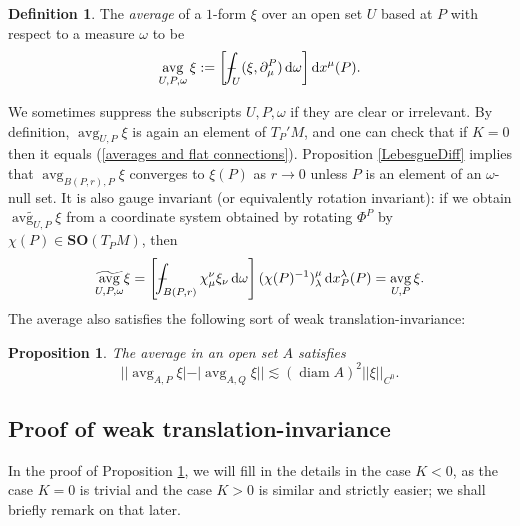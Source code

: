 \documentclass[reqno,11pt]{amsart}
\newcommand{\SpOrth}{\mathbf{SO}}
\DeclareMathOperator{\avg}{avg}
\DeclareMathOperator{\diam}{diam}
\newcommand*\dif{\mathop{}\!\mathrm{d}}
\newcommand{\dfn}[1]{\emph{#1}\index{#1}}
\newtheorem{proposition}[theorem]{Proposition}
\theoremstyle{definition}
\newtheorem{definition}[theorem]{Definition}
\numberwithin{equation}{section}
\def\Xint#1{\mathchoice
{\XXint\displaystyle\textstyle{#1}}%
{\XXint\textstyle\scriptstyle{#1}}%
{\XXint\scriptstyle\scriptscriptstyle{#1}}%
{\XXint\scriptscriptstyle\scriptscriptstyle{#1}}%
\!\int}
\def\XXint#1#2#3{{\setbox0=\hbox{$#1{#2#3}{\int}$ }
\vcenter{\hbox{$#2#3$ }}\kern-.6\wd0}}
\def\dashint{\Xint-}
\begin{document}
\begin{definition}
The \dfn{average} of a $1$-form $\xi$ over an open set $U$ based at $P$ with respect to a measure $\omega$ to be
$$\avg_{U, P, \omega} \xi := \left[\dashint_U (\xi, \partial^P_\mu) \dif \omega\right] \dif x^\mu(P).$$
\end{definition}

We sometimes suppress the subscripts $U, P, \omega$ if they are clear or irrelevant.
By definition, $\avg_{U, P} \xi$ is again an element of $T_P'M$, and one can check that if $K = 0$ then it equals (\ref{averages and flat connections}).
Proposition \ref{LebesgueDiff} implies that $\avg_{B(P, r), P} \xi$ converges to $\xi(P)$ as $r \to 0$ unless $P$ is an element of an $\omega$-null set.
It is also gauge invariant (or equivalently rotation invariant): if we obtain $\widetilde{\avg_{U, P}} \xi$ from a coordinate system obtained by rotating $\Phi^P$ by $\chi(P) \in \SpOrth(T_PM)$, then
$$\widetilde{\avg_{U, P, \omega}} \xi = \left[\dashint_{B(P, r)} \chi^\nu_\mu \xi_\nu \dif \omega\right] (\chi(P)^{-1})_\lambda^\mu \dif x^\lambda_P(P) = \avg_{U, P} \xi.$$
The average also satisfies the following sort of weak translation-invariance:

\begin{proposition}\label{translation invariance}
The average in an open set $A$ satisfies
$$||\avg_{A, P} \xi| - |\avg_{A, Q} \xi|| \lesssim (\diam A)^2 ||\xi||_{C^0}.$$
\end{proposition}

\subsection{Proof of weak translation-invariance}
In the proof of Proposition \ref{translation invariance}, we will fill in the details in the case $K < 0$, as the case $K = 0$ is trivial and the case $K > 0$ is similar and strictly easier; we shall briefly remark on that later.
\end{document}
